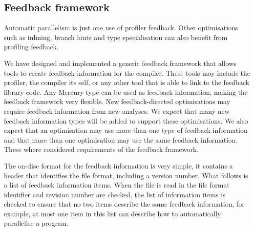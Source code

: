\subsection{Feedback framework}
\label{sec:feedback}

Automatic parallelism is just one use of profiler feedback.
Other optimisations
such as inlining,
branch hints
and type specialisation
can also benefit from profiling feedback.

We have designed and implemented a generic feedback framework that allows
tools to create feedback information for the compiler.
These tools may include the profiler, the compiler its self,
or any other tool that is able to link to the feedback library code.
Any Mercury type can be used as feedback information,
making the feedback framework very flexible.
New feedback-directed optimisations may require feedback information
from new analyses.
We expect that many new feedback information types will be added to
support these optimisations.
We also expect that an optimisation may use more than one type of
feedback information and that more than one optimisation may use the
same feedback information.
These where considered requirements of the feedback framework.

The on-disc format for the feedback information is very simple,
it contains a header that identifies the file format,
including a version number.
What follows is a list of feedback information items.
When the file is read in the file format identifier and revision
number are checked,
the list of information items is checked to ensure that no two items
describe the same feedback information,
for example,
at most one item in this list can describe how to automatically parallelise
a program.


